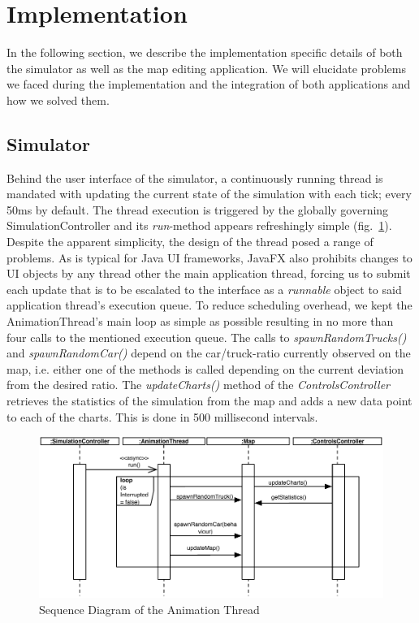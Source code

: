 \section{Implementation}
In the following section, we describe the implementation specific details of both the simulator as well as the map editing application. We will elucidate problems we faced during the implementation and the integration of both applications and how we solved them. 
\subsection{Simulator}
Behind the user interface of the simulator, a continuously running thread is mandated with updating the current state of the simulation with each tick; every 50ms by default. The thread execution is triggered by the globally governing SimulationController and its \textit{run}-method appears refreshingly simple (fig.~\ref{fig:animthread}). Despite the apparent simplicity, the design of the thread posed a range of problems. As is typical for Java UI frameworks, JavaFX also prohibits changes to UI objects by any thread other the main application thread, forcing us to submit each update that is to be escalated to the interface as a \textit{runnable} object to said application thread's execution queue. To reduce scheduling overhead, we kept the AnimationThread's main loop as simple as possible resulting in no more than four calls to the mentioned execution queue. The calls to \textit{spawnRandomTrucks()} and \textit{spawnRandomCar()} depend on the car/truck-ratio currently observed on the map, i.e. either one of the methods is called depending on the current deviation from the desired ratio. The \textit{updateCharts()} method of the \textit{ControlsController} retrieves the statistics of the simulation from the map and adds a new data point to each of the charts. This is done in 500 millisecond intervals.

\begin{figure}[h]
	\begin{center}
		\includegraphics[width=\textwidth]{img/SD_animThread.pdf}
		\caption[Sequence Diagram of the Animation Thread]{Sequence Diagram of the Animation Thread}
		\label{fig:animthread}
	\end{center}

\end{figure}

